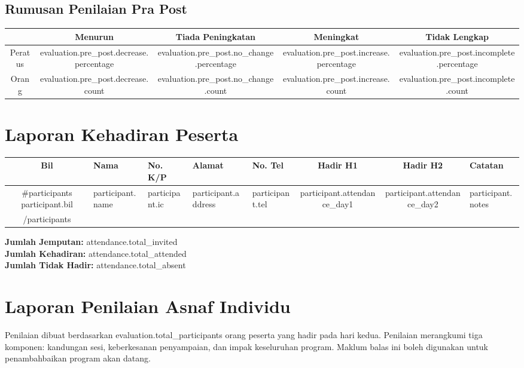 \documentclass[a4paper,12pt]{article}
\begin{document}
\subsection{Rumusan Penilaian Pra Post}
\begin{tabular}{|c|c|c|c|c|}
    \hline
    \rowcolor{lightgray}
    \textbf{} & \textbf{Menurun} & \textbf{Tiada Peningkatan} & \textbf{Meningkat} & \textbf{Tidak Lengkap} \\
    \hline
    Peratus & {{evaluation.pre_post.decrease.percentage}} & {{evaluation.pre_post.no_change.percentage}} & {{evaluation.pre_post.increase.percentage}} & {{evaluation.pre_post.incomplete.percentage}} \\
    \hline
    Orang & {{evaluation.pre_post.decrease.count}} & {{evaluation.pre_post.no_change.count}} & {{evaluation.pre_post.increase.count}} & {{evaluation.pre_post.incomplete.count}} \\
    \hline
\end{tabular}

\section{Laporan Kehadiran Peserta}
\begin{longtable}{|c|p{4cm}|p{3cm}|p{4cm}|p{2cm}|c|c|p{2cm}|}
    \hline
    \rowcolor{lightgray}
    \textbf{Bil} & \textbf{Nama} & \textbf{No. K/P} & \textbf{Alamat} & \textbf{No. Tel} & \textbf{Hadir H1} & \textbf{Hadir H2} & \textbf{Catatan} \\
    \hline
    \endhead
    {{#participants}}
    {{participant.bil}} & {{participant.name}} & {{participant.ic}} & {{participant.address}} & {{participant.tel}} & {{participant.attendance_day1}} & {{participant.attendance_day2}} & {{participant.notes}} \\
    \hline
    {{/participants}}
\end{longtable}

\textbf{Jumlah Jemputan:} {{attendance.total_invited}} \\
\textbf{Jumlah Kehadiran:} {{attendance.total_attended}} \\
\textbf{Jumlah Tidak Hadir:} {{attendance.total_absent}}

\section{Laporan Penilaian Asnaf Individu}
Penilaian dibuat berdasarkan {{evaluation.total_participants}} orang peserta yang hadir pada hari kedua. Penilaian merangkumi tiga komponen: kandungan sesi, keberkesanan penyampaian, dan impak keseluruhan program. Maklum balas ini boleh digunakan untuk penambahbaikan program akan datang.
\end{document}
